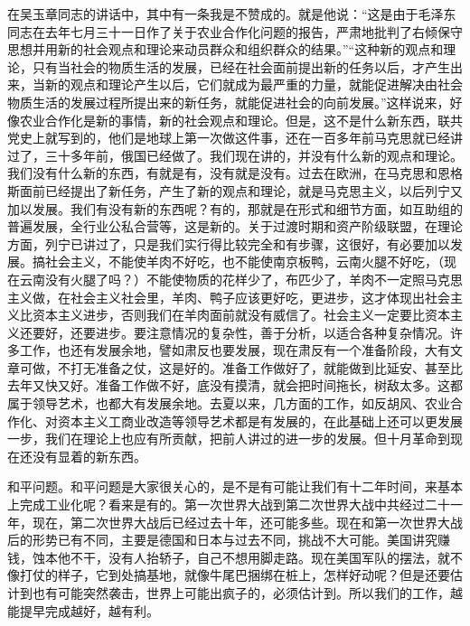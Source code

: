 在吴玉章同志的讲话中，其中有一条我是不赞成的。就是他说：“这是由于毛泽东同志在去年七月三十一日作了关于农业合作化问题的报告，严肃地批判了右倾保守思想并用新的社会观点和理论来动员群众和组织群众的结果。”“这种新的观点和理论，只有当社会的物质生活的发展，已经在社会面前提出新的任务以后，才产生出来，当新的观点和理论产生以后，它们就成为最严重的力量，就能促进解决由社会物质生活的发展过程所提出来的新任务，就能促进社会的向前发展。”这样说来，好像农业合作化是新的事情，新的社会观点和理论。但是，这不是什么新东西，联共党史上就写到的，他们是地球上第一次做这件事，还在一百多年前马克思就已经讲过了，三十多年前，俄国已经做了。我们现在讲的，并没有什么新的观点和理论。我们没有什么新的东西，有就是有，没有就是没有。过去在欧洲，在马克思和恩格斯面前已经提出了新任务，产生了新的观点和理论，就是马克思主义，以后列宁又加以发展。我们有没有新的东西呢？有的，那就是在形式和细节方面，如互助组的普遍发展，全行业公私合营等，这是新的。关于过渡时期和资产阶级联盟，在理论方面，列宁已讲过了，只是我们实行得比较完全和有步骤，这很好，有必要加以发展。搞社会主义，不能使羊肉不好吃，也不能使南京板鸭，云南火腿不好吃，（现在云南没有火腿了吗？）不能使物质的花样少了，布匹少了，羊肉不一定照马克思主义做，在社会主义社会里，羊肉、鸭子应该更好吃，更进步，这才体现出社会主义比资本主义进步，否则我们在羊肉面前就没有威信了。社会主义一定要比资本主义还要好，还要进步。要注意情况的复杂性，善于分析，以适合各种复杂情况。许多工作，也还有发展余地，譬如肃反也要发展，现在肃反有一个准备阶段，大有文章可做，不打无准备之仗，这是好的。准备工作做好了，就能做到比延安、甚至比去年又快又好。准备工作做不好，底没有摸清，就会把时间拖长，树敌太多。这都属于领导艺术，也都大有发展余地。去夏以来，几方面的工作，如反胡风、农业合作化、对资本主义工商业改造等领导艺术都是有发展的，在此基础上还可以更发展一步，我们在理论上也应有所贡献，把前人讲过的进一步的发展。但十月革命到现在还没有显着的新东西。

和平问题。和平问题是大家很关心的，是不是有可能让我们有十二年时间，来基本上完成工业化呢？看来是有的。第一次世界大战到第二次世界大战中共经过二十一年，现在，第二次世界大战后已经过去十年，还可能多些。现在和第一次世界大战后的形势已有不同，主要是德国和日本与过去不同，挑战不大可能。美国讲究赚钱，蚀本他不干，没有人抬轿子，自己不想用脚走路。现在美国军队的摆法，就不像打仗的样子，它到处搞基地，就像牛尾巴捆绑在桩上，怎样好动呢？但是还要估计到也有可能突然袭击，世界上可能出疯子的，必须估计到。所以我们的工作，越能提早完成越好，越有利。

